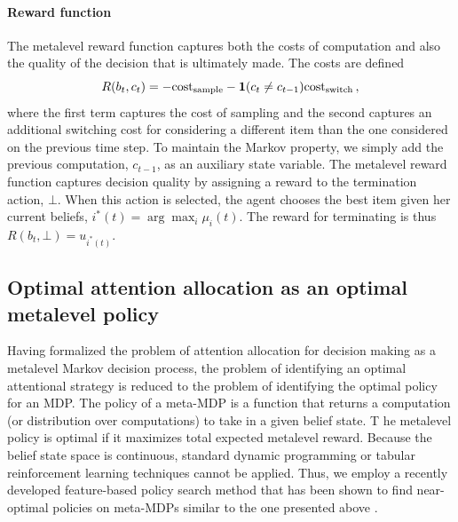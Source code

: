 \documentclass[11pt]{article} %
\begin{document}
\paragraph{Reward function}
The metalevel reward function captures both the costs of computation and also the quality of the decision that is ultimately made. The costs are defined
%
\begin{equation}
R(b_t, c_t) = -\text{cost}_\text{sample} - \mathbf{1}(c_t \neq c_{t-1}) \text{cost}_\text{switch}
\,,
\end{equation}
%
where the first term captures the cost of sampling and the second captures an additional switching cost for considering a different item than the one considered on the previous time step. To maintain the Markov property, we simply add the previous computation, $c_{t-1}$, as an auxiliary state variable. 
The metalevel reward function captures decision quality by assigning a reward to the termination action, $\bot$. When this action is selected, the agent chooses the best item given her current beliefs, $i^*(t) = \arg\max_i \mu_i(t)$. 
The reward for terminating is thus $R(b_t, \bot) = u_{i^*(t)}$.
%


\subsection{Optimal attention allocation as an optimal metalevel policy}
Having formalized the problem of attention allocation for decision making as a metalevel Markov decision process, the problem of identifying an optimal attentional strategy is reduced to the problem of identifying the optimal policy for an MDP. The policy of a meta-MDP is a function that returns a computation (or distribution over computations) to take in a given belief state. T he metalevel policy is optimal if it maximizes total expected metalevel reward.
Because the belief state space is continuous, standard dynamic programming or tabular reinforcement learning techniques cannot be applied. Thus, we employ a recently developed feature-based policy search method that has been shown to find near-optimal policies on meta-MDPs similar to the one presented above \citep{callaway2018learning}.
\end{document}
